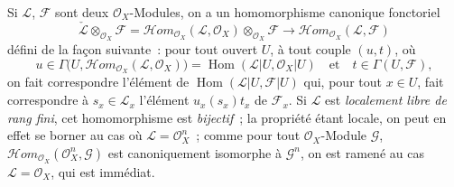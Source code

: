 \begin{env}[5.4.2]
\label{0.5.4.2-fr}
Si $\mathcal{L}$, $\mathcal{F}$ sont deux $\mathcal{O}_X$-Modules, on a un
homomorphisme canonique fonctoriel
\[
  \check{\mathcal{L}}\otimes_{\mathcal{O}_X}\mathcal{F}
  =\mathcal{H}\!om_{\mathcal{O}_X}(\mathcal{L},\mathcal{O}_X)
   \otimes_{\mathcal{O}_X}\mathcal{F}
  \longrightarrow
  \mathcal{H}\!om_{\mathcal{O}_X}(\mathcal{L},\mathcal{F})
  \tag{5.4.2.1}\label{0.5.4.2.1-fr}
\]
défini de la façon suivante~: pour tout ouvert $U$, à tout couple $(u,t)$, où
\[
  u\in\Gamma\bigl(U,
    \mathcal{H}\!om_{\mathcal{O}_X}(\mathcal{L},\mathcal{O}_X)\bigr)
  =\operatorname{Hom}(\mathcal{L}|U,\mathcal{O}_X|U)
  \quad\text{et}\quad
  t\in\Gamma(U,\mathcal{F}),
\]
on fait correspondre l'élément de
$\operatorname{Hom}(\mathcal{L}|U,\mathcal{F}|U)$ qui, pour tout $x\in U$,
fait correspondre à $s_x\in\mathcal{L}_x$ l'élément $u_x(s_x)t_x$ de
$\mathcal{F}_x$. Si $\mathcal{L}$ est \emph{localement libre de rang fini},
cet homomorphisme est \emph{bijectif}~; la propriété étant locale, on peut en
effet se borner au cas où $\mathcal{L}=\mathcal{O}_X^n$~; comme pour tout
$\mathcal{O}_X$-Module $\mathcal{G}$,
$\mathcal{H}\!om_{\mathcal{O}_X}(\mathcal{O}_X^n,\mathcal{G})$ est
canoniquement isomorphe à $\mathcal{G}^n$, on est ramené au cas
$\mathcal{L}=\mathcal{O}_X$, qui est immédiat.
\end{env}

